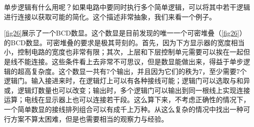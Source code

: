 单步逻辑有什么用呢？如果电路中要同时执行多个简单逻辑，可以将其中若干逻辑进行连接以获取可能的简化。这个描述非常抽象，我们来看一个例子。

\begin{figure}[!htp]
	\centering
	
	\caption{}\label{fig26}
\end{figure}

\autoref{fig26}展示了一个BCD数显。这个数显是目前发现的唯一一个可密堆叠（\autoref{fig26}）的BCD数显。可密堆叠的要求是极其苛刻的。首先，因为下方显示器的宽度相当小，控制电路的宽度也非常有限；其次，上层和下层控制单元需要可以挨在一起但是线不能连接。这些条件看上去非常不可思议，但是数显能做出来，得益于单步逻辑的超高复杂度。这个数显一共有7个输出，并且因为它们的秩为7，至少需要7个逻辑门。输入接进来时，在逻辑灯上可以有各种接线可能；逻辑门可以选取与和异或，逻辑灯数量也可以改变；输出时，多个逻辑门可以输出到同一根线上实现连接运算；电线在显示器上也可以连接若干段。这么算下来，不考虑正确性的情况下，一个简单数显的接线排列组合可以有成千上万种。从这么复杂的情况中找出一种可行方案不算太困难，但是也需要相当的观察力与经验。

